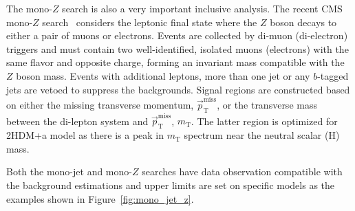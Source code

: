 \documentclass{moriond}
\def\mt{m_{\mathrm{T}}}
\def\ptmiss{\vec{p}_\mathrm{T}^{\mathrm{miss}}}
\begin{document}
The mono-$Z$ search is also a very important inclusive analysis. The recent CMS mono-$Z$
search~\cite{monoz} considers the leptonic final state where the $Z$ boson
decays to either a pair of muons or electrons. Events are collected by di-muon
(di-electron) triggers and must contain two well-identified, isolated muons
(electrons) with the same flavor and opposite charge, forming an invariant mass
compatible with the $Z$ boson mass. Events with additional leptons, more than
one jet or any $b$-tagged jets are vetoed to suppress the backgrounds. Signal
regions are constructed based on either the missing transverse momentum,
$\ptmiss$, or the transverse mass between the di-lepton system and $\ptmiss$,
$\mt$. The latter region is optimized for 2HDM+a model as there is a peak in $\mt$
spectrum near the neutral scalar (H) mass.

Both the mono-jet and mono-$Z$ searches have data observation compatible with the background estimations and upper limits are set on specific models as the examples shown in Figure~\ref{fig:mono_jet_z}. 
\end{document}
